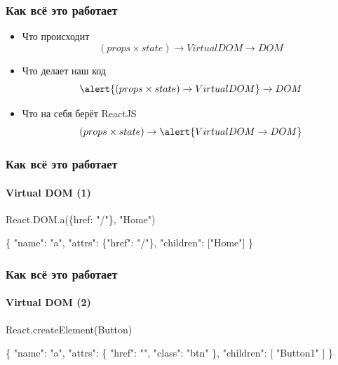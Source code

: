 \documentclass[10pt,utf8]{beamer}
\begin{document}
\begin{frame}[fragile]
  \frametitle{Как всё это работает}

  \begin{itemize}
  \item
    Что происходит
    $$ (props \times state) \rightarrow Virtual DOM \rightarrow DOM $$
    \pause
  \item
    Что делает наш код
    $$ \alert{ (props \times state) \rightarrow Virtual DOM } \rightarrow DOM $$
    \pause
  \item
    Что на себя берёт ReactJS
    $$ (props \times state) \rightarrow \alert{ Virtual DOM \rightarrow DOM } $$
  \end{itemize}
\end{frame}

\begin{frame}[fragile]
  \frametitle{Как всё это работает}
  \framesubtitle{Virtual DOM (1)}

  \begin{semiverbatim}
    React.DOM.a(\{href: "/"\}, "Home")
  \end{semiverbatim}

  \begin{semiverbatim}
    \{
      "name": "a"\phantom{},
      "attrs": \{"href": "/"\},
      "children": ["Home"]
    \}
  \end{semiverbatim}
\end{frame}

\begin{frame}[fragile]
  \frametitle{Как всё это работает}
  \framesubtitle{Virtual DOM (2)}

  \begin{semiverbatim}
    React.createElement(Button)
  \end{semiverbatim}

  \begin{semiverbatim}
    \{
      "name": "a"\phantom{},
      "attrs": \{
        "href": "\phantom{}"\phantom{},
        "class": "btn"
      \},
      "children": [
        "Button1"
      ]
    \}
  \end{semiverbatim}
\end{frame}
\end{document}
